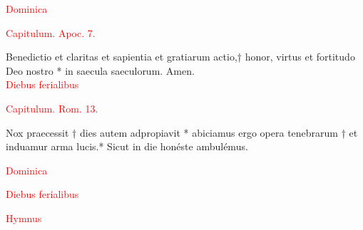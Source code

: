

\noindent\textcolor{red}{Dominica}\\
\begin{center}
 \noindent\textcolor{red}{Capitulum. Apoc. 7.}\\
\end{center}
Benedictio et claritas et sapientia et gratiarum actio,† honor, virtus et fortitudo Deo nostro * in saecula saeculorum. Amen.\\
\noindent\textcolor{red}{Diebus ferialibus}\\
\vspace{4mm}
\begin{center}
 \noindent\textcolor{red}{Capitulum. Rom. 13.}\\
\end{center}
Nox praecessit † dies autem adpropiavit * abiciamus ergo opera tenebrarum † et induamur arma lucis.* Sicut in die honéste ambulémus.\\
\vspace{0.5cm}

\noindent\textcolor{red}{Dominica}\\

\noindent\textcolor{red}{Diebus ferialibus}\\
\vspace{0.7cm}




\begin{center}
 \textcolor{red}{Hymnus}
\end{center}


\vspace{0.3cm}

